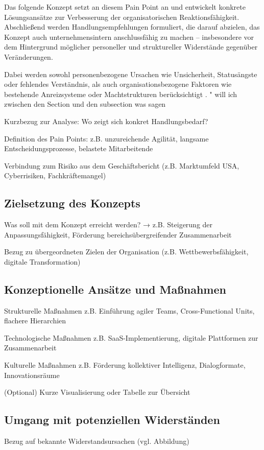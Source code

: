 \documentclass[12pt,a4paper]{article}
\begin{document}
	Das folgende Konzept setzt an diesem Pain Point an und entwickelt konkrete Lösungsansätze zur Verbesserung der organisatorischen Reaktionsfähigkeit. Abschließend werden Handlungsempfehlungen formuliert, die darauf abzielen, das Konzept auch unternehmensintern anschlussfähig zu machen – insbesondere vor dem Hintergrund möglicher personeller und struktureller Widerstände gegenüber Veränderungen.
	
	Dabei werden sowohl personenbezogene Ursachen wie Unsicherheit, Statusängste oder fehlendes Verständnis, als auch organisationsbezogene Faktoren wie bestehende Anreizsysteme oder Machtstrukturen berücksichtigt \parencite{schewe2018}.
	" will ich zwischen den Section und den subsection was sagen 
	
	Kurzbezug zur Analyse: Wo zeigt sich konkret Handlungsbedarf?
	
	Definition des Pain Points: z.B. unzureichende Agilität, langsame Entscheidungsprozesse, belastete Mitarbeitende
	
	Verbindung zum Risiko aus dem Geschäftsbericht (z.B. Marktumfeld USA, Cyberrisiken, Fachkräftemangel)
	
	\subsection{Zielsetzung des Konzepts}
	Was soll mit dem Konzept erreicht werden?
	→ z.B. Steigerung der Anpassungsfähigkeit, Förderung bereichsübergreifender Zusammenarbeit
	
	Bezug zu übergeordneten Zielen der Organisation (z.B. Wettbewerbsfähigkeit, digitale Transformation)
	\subsection{Konzeptionelle Ansätze und Maßnahmen}
	
	Strukturelle Maßnahmen
	z.B. Einführung agiler Teams, Cross-Functional Units, flachere Hierarchien
	
	Technologische Maßnahmen
	z.B. SaaS-Implementierung, digitale Plattformen zur Zusammenarbeit
	
	Kulturelle Maßnahmen
	z.B. Förderung kollektiver Intelligenz, Dialogformate, Innovationsräume
	
	(Optional) Kurze Visualisierung oder Tabelle zur Übersicht
	\subsection{Umgang mit potenziellen Widerständen}
	Bezug auf bekannte Widerstandsursachen (vgl. Abbildung)
	
\end{document}
